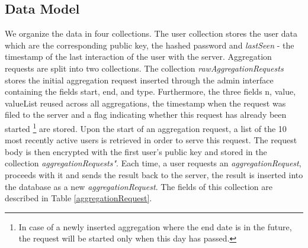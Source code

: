 \subsection{Data Model}\label{server-data-model}
We organize the data in four collections. The user collection stores the user data which are the corresponding public key, the hashed password and \textit{lastSeen} - the timestamp of the last interaction of the user with the server. Aggregation requests are split into two collections. The collection \textit{rawAggregationRequests} stores the initial aggregation request inserted through the admin interface containing the fields start, end, and type. Furthermore, the three fields n, value, valueList reused across all aggregations, the timestamp when the request was filed to the server and a flag indicating whether this request has already been started \footnote{In case of a newly inserted aggregation where the end date is in the future, the request will be started only when this day has passed.} are stored. Upon the start of an aggregation request, a list of the 10 most recently active users is retrieved in order to serve this request. The request body is then encrypted with the first user's public key and stored in the collection \textit{aggregationRequests"}. Each time, a user requests an \textit{aggregationRequest}, proceeds with it and sends the result back to the server, the result is inserted into the database as a new \textit{aggregationRequest}. The fields of this collection are described in Table \ref{aggregationRequest}.

